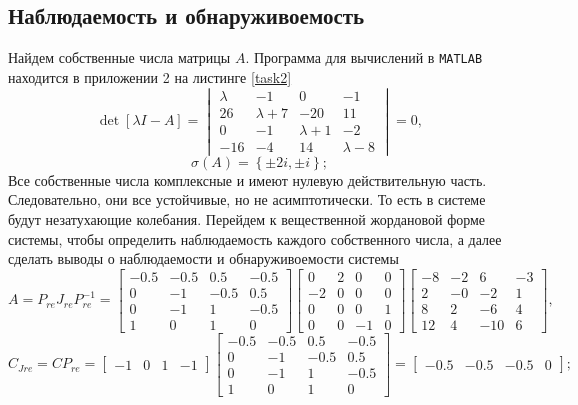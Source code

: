 \documentclass[a4paper, 12pt]{article}
\begin{document}
    \subsection{Наблюдаемость и обнаруживоемость}
    Найдем собственные числа матрицы $A$.
    Программа для вычислений в \texttt{MATLAB} находится в приложении
    2 на листинге \ref{task2}
    $$
    \det{\left[\lambda I-A\right]}=\begin{vmatrix}
        \lambda &-1 &0 &-1\\
        26 &\lambda+7 &-20 &11\\
        0 &-1 &\lambda+1 &-2\\
        -16 &-4 &14 &\lambda-8
    \end{vmatrix}=0,
    $$
    $$
    \sigma\left(A\right)=\left\{\pm2i,\pm i\right\};
    $$
    Все собственные числа комплексные и имеют нулевую действительную часть.
    Следовательно, они все устойчивые, но не асимптотически. То есть в системе будут незатухающие колебания.
    Перейдем к вещественной жордановой форме системы, чтобы определить наблюдаемость каждого собственного числа,
    а далее сделать выводы о наблюдаемости и обнаруживоемости системы
    $$
    A=P_{re}J_{re}P_{re}^{-1}=\begin{bmatrix}
    -0.5 &-0.5    &0.5   &-0.5\\
    0   &-1   &-0.5    &0.5\\
    0   &-1    &1   &-0.5\\
    1   &0    &1    &0
    \end{bmatrix}\begin{bmatrix}
    0    &2   &0    &0\\
   -2   &0    &0   &0\\
    0   &0    &0    &1\\
   0   &0   &-1   &0
    \end{bmatrix}\begin{bmatrix}
    -8   &-2    &6   &-3\\
    2   &-0   &-2    &1\\
    8    &2   &-6    &4\\
   12    &4  &-10    &6
    \end{bmatrix},
    $$
    $$
    C_{Jre}=CP_{re}=\begin{bmatrix}
        -1 &0 &1 &-1
    \end{bmatrix}\begin{bmatrix}
        -0.5 &-0.5    &0.5   &-0.5\\
        0   &-1   &-0.5    &0.5\\
        0   &-1    &1   &-0.5\\
        1   &0    &1    &0
    \end{bmatrix}=\begin{bmatrix}
        -0.5   &-0.5   &-0.5         &0
    \end{bmatrix};
    $$
\end{document}
